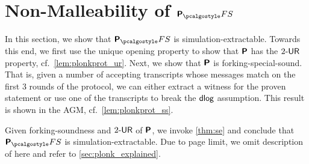 

\section{Non-Malleability of $\plonkprotfs$} 
\label{sec:plonk}
In this section, we show that $\plonkprotfs$ is simulation-extractable. Towards this end, we first use the unique opening property to show that
$\bm{\mathsf{P}}$ has the ${2\text{-}\mathsf{UR}}$ property,
cf.~\cref{lem:plonkprot_ur}.
Next, we show that $\bm{\mathsf{P}}$ is forking-special-sound. That is, given a
number of accepting transcripts whose messages match on the first $3$ rounds of the
protocol, we can either extract a witness for the proven statement or use
one of the transcripts to break the $\mathsf{dlog}$ assumption. This result is shown in
the AGM, cf.~\cref{lem:plonkprot_ss}.


Given forking-soundness and ${2\text{-}\mathsf{UR}}$ of $\bm{\mathsf{P}}$, we invoke \cref{thm:se} and conclude that $\plonkprot_\fs$ is simulation-extractable.
Due to page limit, we omit description of \plonk{} here and refer to
\cref{sec:plonk_explained}. 

\newcommand{\vql}{\vec{q_{L}}}
\newcommand{\vqr}{\vec{q_{R}}}
\newcommand{\vqm}{\vec{q_{M}}}
\newcommand{\vqo}{\vec{q_{O}}}
\newcommand{\vx}{\vec{x}}
\newcommand{\vqc}{\vec{q_{C}}}

